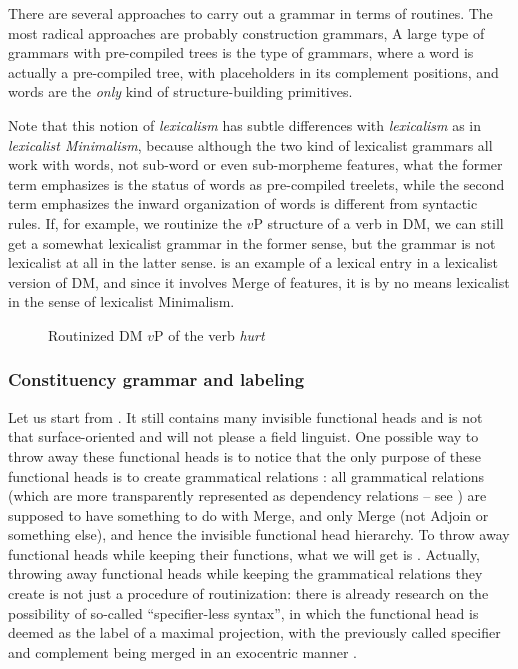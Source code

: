 \documentclass[../main.tex]{subfiles}
\begin{document}
There are several approaches to carry out a grammar in terms of routines. The most radical approaches
are probably construction grammars, %
A large type of grammars with pre-compiled trees is the type of  grammars, where 
a word is actually a pre-compiled tree, with placeholders in its complement positions, and words 
are the \emph{only} kind of structure-building primitives. %

Note that this notion of \emph{lexicalism} has subtle differences 
with \emph{lexicalism} as in \emph{lexicalist Minimalism}, 
because although the two kind of lexicalist grammars all work with words, 
not sub-word or even sub-morpheme features, 
what the former term emphasizes is the status of words as pre-compiled treelets, 
while the second term emphasizes the inward organization of words is different from syntactic rules. 
If, for example, we routinize the $v$P structure of a verb in DM, 
we can still get a somewhat lexicalist grammar in the former sense, 
but the grammar is not lexicalist at all in the latter sense.
 is an example of a lexical entry in a lexicalist version of DM, 
and since it involves Merge of features, it is by no means lexicalist in the sense of lexicalist Minimalism.

\begin{figure}
    \centering
    
    \caption{Routinized DM $v$P of the verb \emph{hurt}}
    \label{fig:hurt-dm-routine}
\end{figure}


\subsubsection{Constituency grammar and labeling}\label{sec:phrase-label}

Let us start from . 
It still contains many invisible functional heads 
and is not that surface-oriented and will not please a field linguist. 
One possible way to throw away these functional heads is to notice that 
the only purpose of these functional heads is to create grammatical relations \citep{hornstein2021extended}: 
all grammatical relations (which are more transparently represented as dependency relations 
-- see ) are supposed to have something to do with Merge, 
and only Merge (not Adjoin or something else), and hence the invisible functional head hierarchy.
To throw away functional heads while keeping their functions, 
what we will get is . 
Actually, throwing away functional heads while keeping the grammatical relations they create 
is not just a procedure of routinization: 
there is already research on the possibility of so-called ``specifier-less syntax'',
in which the functional head is deemed as the label of a maximal projection, 
with the previously called specifier and complement being merged in an exocentric manner \citep{osborne2011bare}.
\end{document}
